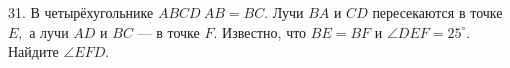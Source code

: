 31. В четырёхугольнике $ABCD\ AB=BC.$ Лучи $BA$ и $CD$ пересекаются в точке $E,$ а лучи $AD$ и $BC$ --- в точке $F.$ Известно, что $BE=BF$ и $\angle DEF=25^\circ.$ Найдите $\angle EFD.$\\

